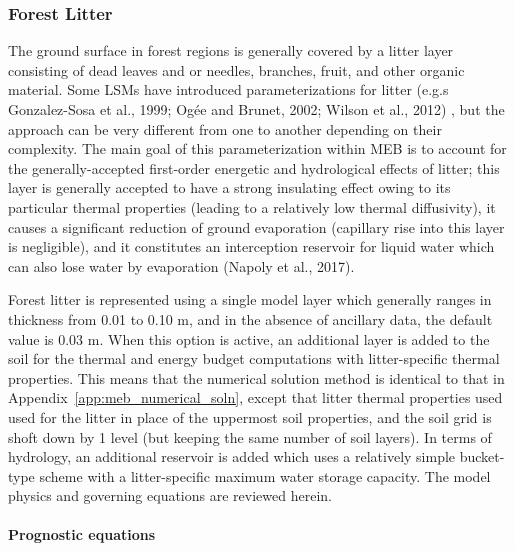 \subsubsection{Forest Litter}
\label{sec:meb_litter}

The ground surface in forest regions is generally covered by a litter
layer consisting of dead leaves and or needles, branches, fruit, 
and other organic material. 
%
Some LSMs have introduced parameterizations for litter 
(e.g.s Gonzalez-Sosa et al., 1999; Og{\'e}e and Brunet, 2002;
Wilson et al., 2012)
\nocite{Gonzalez-Sosa1999,ogee2002forest,wilson2012effect},
but the approach can be very different from one to
another depending on their complexity. 
%
The main goal of this parameterization within MEB
is to account for
the generally-accepted first-order energetic and hydrological effects of litter;
this layer is generally accepted to
have a strong insulating effect 
owing to
its particular thermal properties (leading to a relatively 
low thermal diffusivity),
it causes a significant reduction of ground evaporation
(capillary rise into this layer is negligible),
and it
constitutes an interception reservoir for liquid water
which can also lose water by evaporation
(Napoly et al., 2017)\nocite{napoly_ea_2017}.


Forest litter is represented using a single model layer which
generally ranges
in thickness from 0.01 to 0.10 m, and in the absence of ancillary
data, the default value is 0.03 m. When this option is active, an
additional layer is added to the soil for the thermal and energy
budget computations with litter-specific thermal properties. This
means that the numerical solution method is identical to that
in Appendix~\ref{app:meb_numerical_soln}, except that litter thermal properties used
used for the litter in place of the uppermost soil properties, and the
soil grid is shoft down by 1 level (but keeping the same number of
soil layers).
%
In terms of
hydrology, an additional reservoir is added which uses a relatively
simple bucket-type scheme with a litter-specific maximum water storage
capacity. The model physics and governing equations are reviewed herein.

\paragraph{Prognostic equations}

